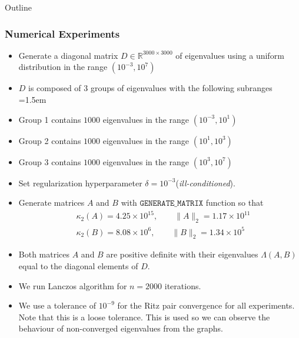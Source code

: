 \documentclass[landscape]{beamer}
\let\oldenumerate=\enumerate
\renewenvironment{enumerate}{\oldenumerate\parindent=1.5em}{\endlist}
\begin{document}
\begin{frame}[allowframebreaks]{Outline}
  \frametitle{Numerical Experiments}
  \begin{itemize}
  \item Generate a diagonal matrix $D \in \mathbb{R}^{3000 \times 3000}$ of eigenvalues using a uniform distribution in the range $(10^{-3}, 10^7)$
  \item $D$ is composed of $3$ groups of eigenvalues with the following subranges
  \begin{enumerate}
  	\item Group 1 contains $1000$ eigenvalues in the range $(10^{-3}, 10^1)$
  	\item Group 2 contains $1000$ eigenvalues in the range $(10^{1}, 10^3)$
  	\item Group 3 contains $1000$ eigenvalues in the range $(10^{3}, 10^7)$
  \end{enumerate}
  
  \item Set regularization hyperparameter $\delta = 10^{-3}$(\textit{ill-conditioned}).
  
  \item Generate matrices $A$ and $B$ with $\texttt{GENERATE\_MATRIX}$ function so that 
    \begin{align*}
      &\kappa_2(A) = 4.25\times 10^{15}, \qquad \|A\|_2 = 1.17\times 10^{11}\\
      &\kappa_2(B) = 8.08\times 10^{6}, \qquad \|B\|_2 = 1.34 \times 10^{5}
    \end{align*}
   \pagebreak
   \item Both matrices $A$ and $B$ are positive definite with their eigenvalues $\Lambda(A, B)$ equal to the diagonal elements of $D$.
   \item We run Lanczos algorithm for $n=2000$ iterations.
   \item We use a tolerance of $10^{-9}$ for the Ritz pair convergence for all experiments. Note that this is a loose tolerance. This is used so we can observe the behaviour of non-converged eigenvalues from the graphs.
  \end{itemize}
\end{frame}
\end{document}
